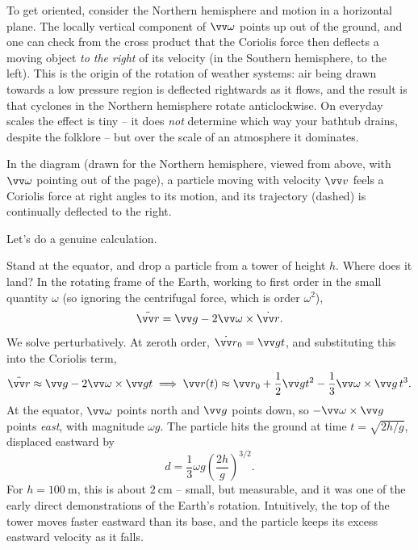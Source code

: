 To get oriented, consider the Northern hemisphere and motion in a horizontal plane. The locally vertical component of $\vv \omega$ points up out of the ground, and one can check from the cross product that the Coriolis force then deflects a moving object \emph{to the right} of its velocity (in the Southern hemisphere, to the left). This is the origin of the rotation of weather systems: air being drawn towards a low pressure region is deflected rightwards as it flows, and the result is that cyclones in the Northern hemisphere rotate anticlockwise. On everyday scales the effect is tiny -- it does \emph{not} determine which way your bathtub drains, despite the folklore -- but over the scale of an atmosphere it dominates.

\begin{center}
\end{center}

In the diagram (drawn for the Northern hemisphere, viewed from above, with $\vv \omega$ pointing out of the page), a particle moving with velocity $\vv v$ feels a Coriolis force at right angles to its motion, and its trajectory (dashed) is continually deflected to the right.

Let's do a genuine calculation.

\begin{example}
	Stand at the equator, and drop a particle from a tower of height $h$. Where does it land? In the rotating frame of the Earth, working to first order in the small quantity $\omega$ (so ignoring the centrifugal force, which is order $\omega^2$),
	$$
	\ddot{\vv r} = \vv g - 2 \vv \omega \times \dot{\vv r}.
	$$
	We solve perturbatively. At zeroth order, $\dot{\vv r}_0 = \vv g t$, and substituting this into the Coriolis term,
	$$
	\ddot{\vv r} \approx \vv g - 2 \vv \omega \times \vv g t \implies \vv r(t) \approx \vv r_0 + \frac{1}{2}\vv g t^2 - \frac{1}{3} \vv \omega \times \vv g \, t^3.
	$$
	At the equator, $\vv \omega$ points north and $\vv g$ points down, so $-\vv \omega \times \vv g$ points \emph{east}, with magnitude $\omega g$. The particle hits the ground at time $t = \sqrt{2h/g}$, displaced eastward by
	$$
	d = \frac{1}{3}\omega g \left(\frac{2h}{g}\right)^{3/2}.
	$$
	For $h = \SI{100}{\meter}$, this is about $\SI{2}{\centi\meter}$ -- small, but measurable, and it was one of the early direct demonstrations of the Earth's rotation. Intuitively, the top of the tower moves faster eastward than its base, and the particle keeps its excess eastward velocity as it falls.
\end{example}

